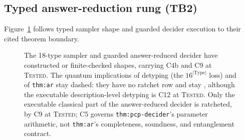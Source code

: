 \subsection{Typed answer-reduction rung (TB2)}

Figure~\ref{fig:D-correspondence-typed} follows typed sampler shape and guarded
decider execution to their cited theorem boundary.
\begin{figure}[H]
\centering

\caption{The 18-type sampler and guarded answer-reduced decider have constructed or finite-checked shapes, carrying C4b and C9 at \textsc{Tested}.  The quantum implications of detyping (the \(16^{|\mathrm{Type}|}\) loss) and of \texttt{thm:ar} stay dashed: they have no ratchet row and stay , although the executable description-level detyping is C12 at \textsc{Tested}.  Only the executable classical part of the answer-reduced decider is ratcheted, by C9 at \textsc{Tested}; C5 governs \texttt{thm:pcp-decider}'s parameter arithmetic, not \texttt{thm:ar}'s completeness, soundness, and entanglement contract.}
\label{fig:D-correspondence-typed}
\end{figure}

